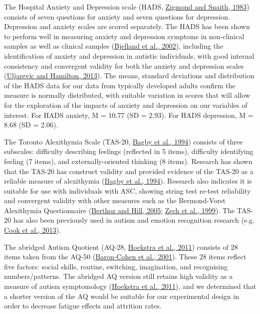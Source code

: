 \documentclass[
]{article}
\begin{document}
The Hospital Anxiety and Depression scale (HADS, \protect\hyperlink{ref-zigmond1983a}{Zigmond and Snaith, 1983}) consists of seven questions for anxiety and seven questions for depression. Depression and anxiety scales are scored separately. The HADS has been shown to perform well in measuring anxiety and depression symptoms in non-clinical samples as well as clinical samples (\protect\hyperlink{ref-bjelland2002a}{Bjelland et al., 2002}), including the identification of anxiety and depression in autistic individuals, with good internal consistency and convergent validity for both the anxiety and depression scales (\protect\hyperlink{ref-uljarevic2013a}{Uljarevic and Hamilton, 2013}). The means, standard deviations and distribution of the HADS data for our data from typically developed adults confirm the measure is normally distributed, with suitable variation in scores that will allow for the exploration of the impacts of anxiety and depression on our variables of interest. For HADS anxiety, M = 10.77 (SD = 2.93). For HADS depression, M = 8.68 (SD = 2.06).

The Toronto Alexithymia Scale (TAS-20, \protect\hyperlink{ref-bagby1994a}{Bagby et al., 1994}) consists of three subscales: difficulty describing feelings (reflected in 5 items), difficulty identifying feeling (7 items), and externally-oriented thinking (8 items). Research has shown that the TAS-20 has construct validity and provided evidence of the TAS-20 as a reliable measure of alexithymia (\protect\hyperlink{ref-bagby1994a}{Bagby et al., 1994}). Research also indicates it is suitable for use with individuals with ASC, showing string test re-test reliability and convergent validity with other measures such as the Bermond-Vorst Alexithymia Questionnaire (\protect\hyperlink{ref-berthoz2005a}{Berthoz and Hill, 2005}; \protect\hyperlink{ref-zech1999a}{Zech et al., 1999}). The TAS-20 has also been previously used in autism and emotion recognition research (e.g. \protect\hyperlink{ref-cook2013a}{Cook et al., 2013}).

The abridged Autism Quotient (AQ-28, \protect\hyperlink{ref-hoekstra2011a}{Hoekstra et al., 2011}) consists of 28 items taken from the AQ-50 (\protect\hyperlink{ref-baron-cohen2001a}{Baron-Cohen et al., 2001}). These 28 items reflect five factors: social skills, routine, switching, imagination, and recognising numbers/patterns. The abridged AQ version still retains high validity as a measure of autism symptomology (\protect\hyperlink{ref-hoekstra2011a}{Hoekstra et al., 2011}), and we determined that a shorter version of the AQ would be suitable for our experimental design in order to decrease fatigue effects and attrition rates.
\end{document}
